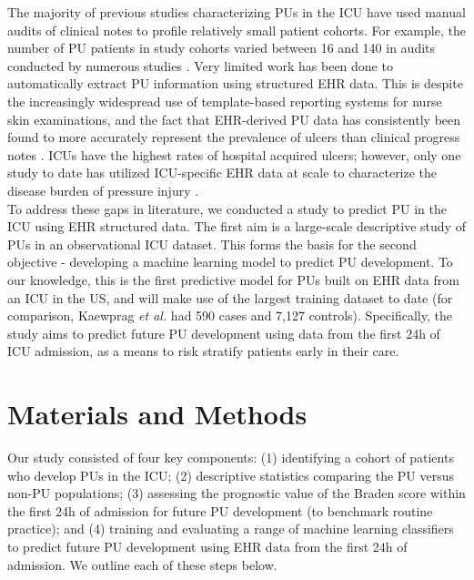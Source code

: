 \documentclass{ws-procs11x85}
\begin{document}
\noindent
The majority of previous studies characterizing PUs in the ICU have used manual audits of clinical notes to profile relatively small patient cohorts. For example, the number of PU patients in study cohorts varied between 16 and 140 in audits conducted by numerous studies \cite{cooper,sayar,lena2}. Very limited work has been done to automatically extract PU information using structured EHR data. This is despite the increasingly widespread use of template-based reporting systems for nurse skin examinations, and the fact that EHR-derived PU data has consistently been found to more accurately represent the prevalence of ulcers than clinical progress notes \cite{lena, ahmad}. ICUs have the highest rates of hospital acquired ulcers; however, only one study to date has utilized ICU-specific EHR data at scale to characterize the disease burden of pressure injury \cite{ohio}. \\

\noindent
To address these gaps in literature, we conducted a study to predict PU in the ICU using EHR structured data. The first aim is a large-scale descriptive study of PUs in an observational ICU dataset. This forms the basis for the second objective - developing a machine learning model to predict PU development. To our knowledge, this is the first predictive model for PUs built on EHR data from an ICU in the US, and will make use of the largest training dataset to date (for comparison, Kaewprag \emph{et al.} had 590 cases and 7,127 controls)\cite{ohio}. Specifically, the study aims to predict future PU development using data from the first 24h of ICU admission, as a means to risk stratify patients early in their care. 

\newpage
\section{Materials and Methods}
Our study consisted of four key components: (1) identifying a cohort of patients who develop PUs in the ICU; (2) descriptive statistics comparing the PU versus non-PU populations; (3) assessing the prognostic value of the Braden score within the first 24h of admission for future PU development (to benchmark routine practice); and (4) training and evaluating a range of machine learning classifiers to predict future PU development using EHR data from the first 24h of admission. We outline each of these steps below. 
\end{document}
